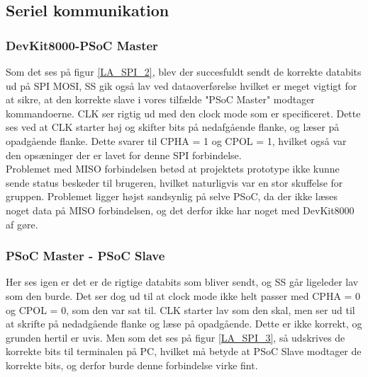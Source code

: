 \subsection{Seriel kommunikation}
\subsubsection{DevKit8000-PSoC Master}

Som det ses på figur \ref{LA_SPI_2}, blev der succesfuldt sendt de korrekte databits ud på SPI MOSI, SS gik også lav ved dataoverførelse hvilket er meget vigtigt
for at sikre, at den korrekte slave i vores tilfælde "PSoC Master" modtager kommandoerne. CLK ser rigtig ud med den clock mode som er specificeret.
Dette ses ved at CLK starter høj og skifter bits på nedafgående flanke, og læser på opadgående flanke. Dette svarer til CPHA = 1 og CPOL = 1, hvilket også var 
den opsæninger der er lavet for denne SPI forbindelse.\\

Problemet med MISO forbindelsen betød at projektets prototype ikke kunne sende status beskeder til brugeren, hvilket naturligvis var en stor skuffelse for
gruppen. Problemet ligger højst sandsynlig på selve PSoC, da der ikke læses noget data på MISO forbindelsen, og det derfor ikke har noget med DevKit8000 af gøre.


\subsubsection{PSoC Master - PSoC Slave}

Her ses igen er det er de rigtige databits som bliver sendt, og SS går ligeleder lav som den burde. Det ser dog ud til at clock mode ikke helt passer med
CPHA = 0 og CPOL = 0, som den var sat til. CLK starter lav som den skal, men ser ud til at skrifte på nedadgående flanke og læse på opadgående. Dette
er ikke korrekt, og grunden hertil er uvis. Men som det ses på figur \ref{LA_SPI_3}, så udskrives de korrekte bits til terminalen på PC, hvilket må betyde at 
PSoC Slave modtager de korrekte bits, og derfor burde denne forbindelse virke fint.